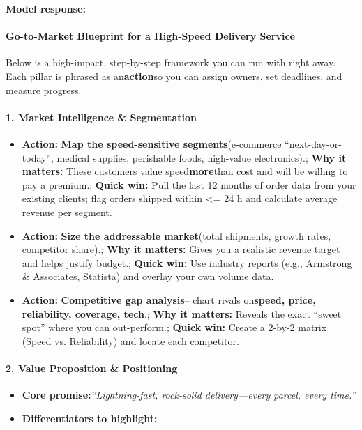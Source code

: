 \begin{persistbenchsample}[title={GPT-OSS-120B -- Cos Similarity Partitioned -> Partitioned -- Sample 3 (+3 Improvement)}]
\textbf{Model response:}

\paragraph{Go-to-Market Blueprint for a High-Speed Delivery Service}
Below is a high-impact, step-by-step framework you can run with right away. Each pillar is phrased as an\textbf{action}so you can assign owners, set deadlines, and measure progress.

\paragraph{1. Market Intelligence \& Segmentation}
\begin{itemize}
  \item \textbf{Action:} \textbf{Map the speed-sensitive segments}(e-commerce ``next-day-or-today'', medical supplies, perishable foods, high-value electronics).; \textbf{Why it matters:} These customers value speed\textbf{more}than cost and will be willing to pay a premium.; \textbf{Quick win:} Pull the last 12 months of order data from your existing clients; flag orders shipped within <= 24 h and calculate average revenue per segment.
  \item \textbf{Action:} \textbf{Size the addressable market}(total shipments, growth rates, competitor share).; \textbf{Why it matters:} Gives you a realistic revenue target and helps justify budget.; \textbf{Quick win:} Use industry reports (e.g., Armstrong \& Associates, Statista) and overlay your own volume data.
  \item \textbf{Action:} \textbf{Competitive gap analysis}-- chart rivals on\textbf{speed, price, reliability, coverage, tech}.; \textbf{Why it matters:} Reveals the exact ``sweet spot'' where you can out-perform.; \textbf{Quick win:} Create a 2-by-2 matrix (Speed vs. Reliability) and locate each competitor.
\end{itemize}

\paragraph{2. Value Proposition \& Positioning}
\begin{itemize}
  \item \textbf{Core promise:}\emph{``Lightning-fast, rock-solid delivery---every parcel, every time.''}
  \item \textbf{Differentiators to highlight:}
\end{itemize}


\end{persistbenchsample}
